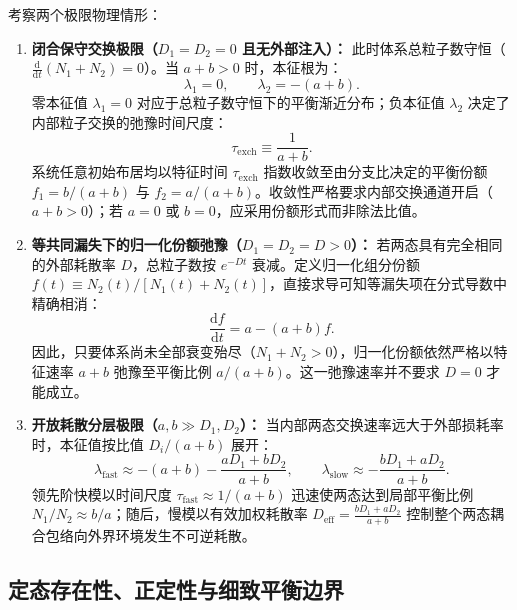 考察两个极限物理情形：
\begin{enumerate}
\item \textbf{闭合保守交换极限（$D_1 = D_2 = 0$ 且无外部注入）：}
此时体系总粒子数守恒（$\frac{\mathrm{d}}{\mathrm{d}t}(N_1 + N_2) = 0$）。当 $a + b > 0$ 时，本征根为：
\begin{equation}\label{eq:appD-closed-eigenvalues}
\lambda_1 = 0, \qquad \lambda_2 = -(a + b).
\end{equation}
零本征值 $\lambda_1 = 0$ 对应于总粒子数守恒下的平衡渐近分布；负本征值 $\lambda_2$ 决定了内部粒子交换的弛豫时间尺度：
\begin{equation}\label{eq:appD-texch-def}
\tau_{\mathrm{exch}} \equiv \frac{1}{a + b}.
\end{equation}
系统任意初始布居均以特征时间 $\tau_{\mathrm{exch}}$ 指数收敛至由分支比决定的平衡份额 $f_1 = b/(a+b)$ 与 $f_2 = a/(a+b)$。收敛性严格要求内部交换通道开启（$a + b > 0$）；若 $a=0$ 或 $b=0$，应采用份额形式而非除法比值。
\item \textbf{等共同漏失下的归一化份额弛豫（$D_1 = D_2 = D > 0$）：}
若两态具有完全相同的外部耗散率 $D$，总粒子数按 $e^{-Dt}$ 衰减。定义归一化组分份额 $f(t) \equiv N_2(t) / [N_1(t) + N_2(t)]$，直接求导可知等漏失项在分式导数中精确相消：
\begin{equation}\label{eq:appD-equal-loss-relaxation}
\frac{\mathrm{d}f}{\mathrm{d}t} = a - (a + b) f.
\end{equation}
因此，只要体系尚未全部衰变殆尽（$N_1 + N_2 > 0$），归一化份额依然严格以特征速率 $a + b$ 弛豫至平衡比例 $a/(a+b)$。这一弛豫速率并不要求 $D = 0$ 才能成立。
\item \textbf{开放耗散分层极限（$a, b \gg D_1, D_2$）：}
当内部两态交换速率远大于外部损耗率时，本征值按比值 $D_i / (a+b)$ 展开：
\begin{equation}\label{eq:appD-open-fast-slow}
\lambda_{\mathrm{fast}} \approx -(a + b) - \frac{a D_1 + b D_2}{a + b}, \qquad \lambda_{\mathrm{slow}} \approx -\frac{b D_1 + a D_2}{a + b}.
\end{equation}
领先阶快模以时间尺度 $\tau_{\mathrm{fast}} \approx 1/(a+b)$ 迅速使两态达到局部平衡比例 $N_1/N_2 \approx b/a$；随后，慢模以有效加权耗散率 $D_{\mathrm{eff}} = \frac{b D_1 + a D_2}{a + b}$ 控制整个两态耦合包络向外界环境发生不可逆耗散。
\end{enumerate}

\subsection{定态存在性、正定性与细致平衡边界}

